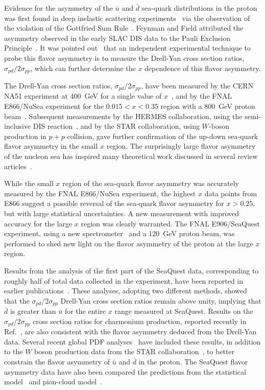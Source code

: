 \documentclass[reprint,aps,unsortedaddress,superscriptaddress,prl,floatfix,showpacs,linenumbers]{revtex4-2}
\begin{document}
Evidence for the asymmetry of the $\bar{u}$ and $\bar{d}$ sea-quark
distributions in the proton was first found in
deep inelastic scattering experiments~\cite{stein1975,amaudruz1991} via
the observation of the violation
of the Gottfried Sum Rule~\cite{gottfried1967}. Feynman and Field
attributed the asymmetry observed in the early SLAC DIS data to the Pauli
Exclusion Principle~\cite{field1977}. It was pointed out~\cite{ellis1991}
that an independent experimental technique to probe this flavor asymmetry is
to measure the Drell-Yan cross section ratios,
$\sigma_{pd}/2\sigma_{pp}$, which can further determine the $x$ dependence
of this flavor asymmetry.

The Drell-Yan cross section ratios,
$\sigma_{pd}/2\sigma_{pp}$, have been measured by the CERN NA51 experiment at
\SI{400}{\GeV} for a single value of $x$~\cite{NA51:1994xrz}, and by the FNAL
E866/NuSea experiment for the $0.015 < x < 0.35$ region with a \SI{800}{\GeV}
proton beam~\cite{hawker1998,peng1998,towell2001}. Subsequent measurements by the
HERMES collaboration, using the semi-inclusive DIS reaction~\cite{ackerstaff1998},
and by the STAR collaboration, using $W$-boson production in $p+p$ collision,
gave further confirmation of the up-down sea-quark flavor asymmetry in
the small $x$ region. The surprisingly large flavor asymmetry of the nucleon
sea has inspired many theoretical work discussed in several review
articles~\cite{kumano1998,vogt2000a,garvey2001,chang2014,geesaman2019}.

While the small $x$ region of the sea-quark flavor asymmetry was accurately
measured by the FNAL E866/NuSea experiment, the highest $x$ data points from
E866 suggest a possible reversal of the sea-quark flavor asymmetry for $x > 0.25$,
but with large statistical uncertainties. A new measurement with improved
accuracy for the large $x$ region was clearly warranted. The FNAL
E906/SeaQuest experiment, using a new spectrometer~\cite{aidala2019} and
a \SI{120}{\GeV} proton beam, was performed to shed new light on the flavor asymmetry
of the proton at the large $x$ region.

Results from the analysis of the first part of the SeaQuest data, corresponding
to roughly half of total data collected in the experiment, have been reported
in earlier publications~\cite{dove2021,dove2023}.
These analyses, adopting two different methods, showed that the
$\sigma_{pd}/2\sigma_{pp}$ Drell-Yan cross section ratios remain
above unity, implying that
$\bar{d}$ is greater than $\bar{u}$ for the entire $x$ range measured
at SeaQuest. Results on the $\sigma_{pd}/2\sigma_{pp}$  cross section ratios
for charmonium production, reported recently in
Ref.~\cite{leung2024a}, are also consistent with the flavor asymmetry
deduced from the Drell-Yan data.
Several recent global PDF
analyses~\cite{cocuzza2021,ball2022a,accardi2023,alekhin2023}
have included these results, in addition to the $W$ boson production data
from the STAR collaboration~\cite{adam2021}, to better constrain the
flavor asymmetry of $\bar u$ and $\bar d$ in the proton. The SeaQuest
flavor asymmetry data have also been compared the predictions from the
statistical model~\cite{soffer2019} and pion-cloud model~\cite{alberg2022}.
\end{document}
